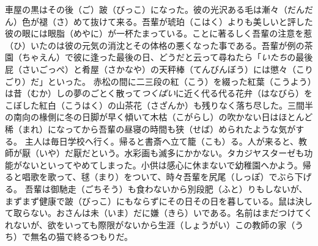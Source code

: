 \documentclass{book}
\begin{document}
車屋の黒はその後（ご）跛（びっこ）になった。彼の光沢ある毛は漸々（だんだん）色が褪（さ）めて抜けて来る。吾輩が琥珀（こはく）よりも美しいと評した彼の眼には眼脂（めやに）が一杯たまっている。ことに著るしく吾輩の注意を惹（ひ）いたのは彼の元気の消沈とその体格の悪くなった事である。吾輩が例の茶園（ちゃえん）で彼に逢った最後の日、どうだと云って尋ねたら「\emph{いたち}の最後屁（さいごっぺ）と肴屋（さかなや）の天秤棒（てんびんぼう）には懲々（こりごり）だ」といった。
赤松の間に二三段の紅（こう）を綴った紅葉（こうよう）は昔（むか）しの夢のごとく散って\emph{つくばい}に近く代る代る花弁（はなびら）をこぼした紅白（こうはく）の山茶花（さざんか）も残りなく落ち尽した。三間半の南向の椽側に冬の日脚が早く傾いて木枯（こがらし）の吹かない日はほとんど稀（まれ）になってから吾輩の昼寝の時間も狭（せば）められたような気がする。
主人は毎日学校へ行く。帰ると書斎へ立て籠（こも）る。人が来ると、教師が厭（いや）だ厭だという。水彩画も滅多にかかない。タカジヤスターゼも功能がないといってやめてしまった。小供は感心に休まないで幼稚園へかよう。帰ると唱歌を歌って、毬（まり）をついて、時々吾輩を尻尾（しっぽ）でぶら下げる。
吾輩は御馳走（ごちそう）も食わないから別段肥（ふと）りもしないが、まずまず健康で跛（びっこ）にもならずにその日その日を暮している。鼠は決して取らない。おさんは未（いま）だに嫌（きら）いである。名前はまだつけてくれないが、欲をいっても際限がないから生涯（しょうがい）この教師の家（うち）で無名の猫で終るつもりだ。
\end{document}
